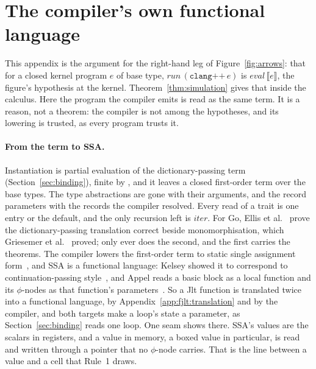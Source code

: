 \section{The compiler's own functional language}
\label{app:fjlt:ssa}

This appendix is the argument for the right-hand leg of Figure~\ref{fig:arrows}: that for a closed kernel program $e$ of base type, $\mathit{run}\,(\texttt{clang++}\,e)$ is $\mathit{eval}\,\llbracket e \rrbracket$, the figure's hypothesis at the kernel.
Theorem~\ref{thm:simulation} gives that inside the calculus.
Here the program the compiler emits is read as the same term.
It is a reason, not a theorem: the compiler is not among the hypotheses, and its lowering is trusted, as every \Cpp{} program trusts it.

\paragraph{From the term to SSA.}
Instantiation is partial evaluation of the dictionary-passing term (Section~\ref{sec:binding}), finite by \RuleThree{}, and it leaves a closed first-order term over the base types.
The type abstractions are gone with their arguments, and the record parameters with the records the compiler resolved.
Every read of a trait is one entry or the default, and the only recursion left is $\mathit{iter}$.
For Go, Ellis et al.~\cite{ellis2022generic} prove the dictionary-passing translation correct beside monomorphisation, which Griesemer et al.~\cite{griesemer2020featherweight} proved; \Cpp{} only ever does the second, and the first carries the theorems.
The compiler lowers the first-order term to static single assignment form~\cite{cytron1991ssa}, and SSA is a functional language: Kelsey showed it to correspond to continuation-passing style~\cite{kelsey1995correspondence}, and Appel reads a basic block as a local function and its $\phi$-nodes as that function's parameters~\cite{appel1998ssa}.
So a Jlt function is translated twice into a functional language, by Appendix~\ref{app:fjlt:translation} and by the compiler, and both targets make a loop's state a parameter, as Section~\ref{sec:binding} reads one loop.
One seam shows there.
SSA's values are the scalars in registers, and a value in memory, a boxed value in particular, is read and written through a pointer that no $\phi$-node carries.
That is the line between a value and a cell that Rule~1 draws.
